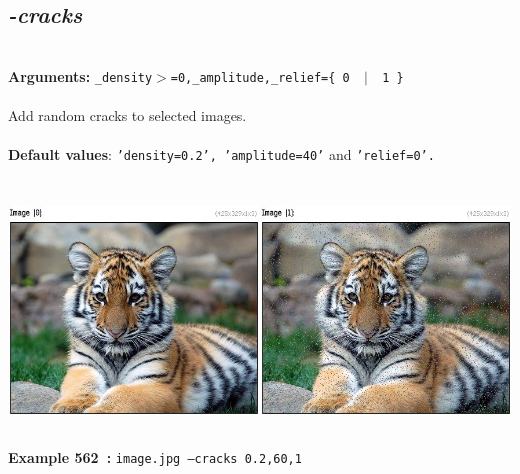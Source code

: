 \documentclass[a4paper,11pt,twoside]{book}
\begin{document}
\subsection{\emph{-cracks} }\vspace*{-0.5em}
~\\\textbf{Arguments: } 
{\small \texttt{\_density$>$=0,\_amplitude,\_relief=\{ 0 ~$|$~ 1 \}}}\\~\\
Add random cracks to selected images.
~\\~\\\textbf{Default values}: {\small \texttt{'density=0.2', 'amplitude=40'} and \texttt{'relief=0'.}}
\begin{center}\includegraphics[keepaspectratio=true,height=7cm,width=\textwidth]{img/gmic_def562.jpg}\\
{\footnotesize \textbf{Example 562~:} \texttt{image.jpg --cracks 0.2,60,1}}
\end{center}
\end{document}
